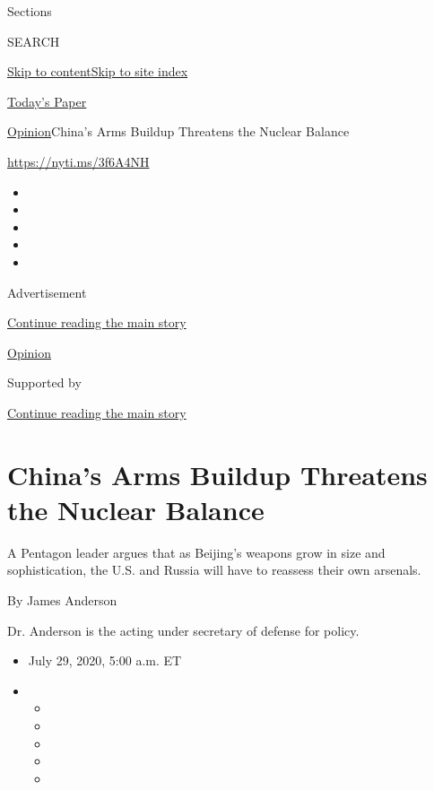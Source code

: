 Sections

SEARCH

\protect\hyperlink{site-content}{Skip to
content}\protect\hyperlink{site-index}{Skip to site index}

\href{https://myaccount.nytimes.com/auth/login?response_type=cookie\&client_id=vi}{}

\href{https://www.nytimes.com/section/todayspaper}{Today's Paper}

\href{/section/opinion}{Opinion}\textbar{}China's Arms Buildup Threatens
the Nuclear Balance

\url{https://nyti.ms/3f6A4NH}

\begin{itemize}
\item
\item
\item
\item
\item
\end{itemize}

Advertisement

\protect\hyperlink{after-top}{Continue reading the main story}

\href{/section/opinion}{Opinion}

Supported by

\protect\hyperlink{after-sponsor}{Continue reading the main story}

\hypertarget{chinas-arms-buildup-threatens-the-nuclear-balance}{%
\section{China's Arms Buildup Threatens the Nuclear
Balance}\label{chinas-arms-buildup-threatens-the-nuclear-balance}}

A Pentagon leader argues that as Beijing's weapons grow in size and
sophistication, the U.S. and Russia will have to reassess their own
arsenals.

By James Anderson

Dr. Anderson is the acting under secretary of defense for policy.

\begin{itemize}
\item
  July 29, 2020, 5:00 a.m. ET
\item
  \begin{itemize}
  \item
  \item
  \item
  \item
  \item
  \end{itemize}
\end{itemize}

